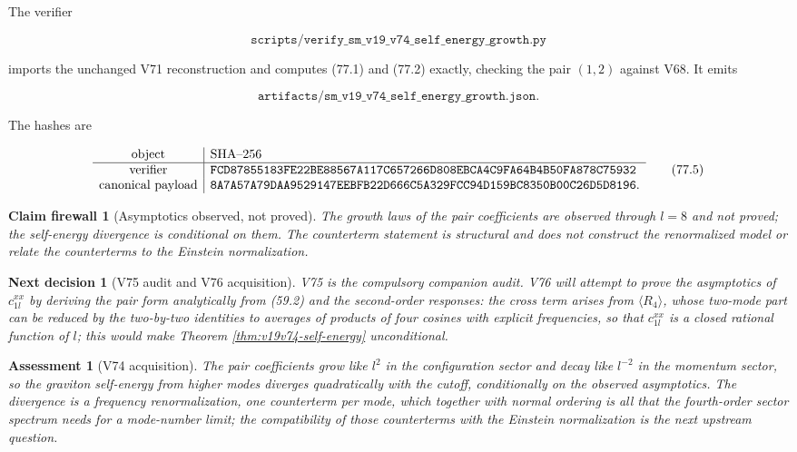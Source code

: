 \documentclass[11pt]{article}
\newtheorem{firewall}[theorem]{Claim firewall}
\newtheorem{decision}[theorem]{Next decision}
\newtheorem{assessment}[theorem]{Assessment}
\theoremstyle{remark}
\begin{document}
The verifier

\[
 \texttt{scripts/verify\_sm\_v19\_v74\_self\_energy\_growth.py}      \tag{77.3}
\]

imports the unchanged V71 reconstruction and computes (77.1) and
(77.2) exactly, checking the pair \((1,2)\) against V68.  It emits

\[
 \texttt{artifacts/sm\_v19\_v74\_self\_energy\_growth.json}.         \tag{77.4}
\]

The hashes are

\[
\begin{array}{c|l}
\hbox{object}&\hbox{SHA--256}\\ \hline
\hbox{verifier}&
\texttt{FCD87855183FE22BE88567A117C657266D808EBCA4C9FA64B4B50FA878C75932}\\
\hbox{canonical payload}&
\texttt{8A7A57A79DAA9529147EEBFB22D666C5A329FCC94D159BC8350B00C26D5D8196}.
\end{array}                                                     \tag{77.5}
\]

\begin{firewall}[Asymptotics observed, not proved]
\label{fire:v19v74}
The growth laws of the pair coefficients are observed through
\(l=8\) and not proved; the self-energy divergence is conditional on
them.  The counterterm statement is structural and does not construct
the renormalized model or relate the counterterms to the Einstein
normalization.
\end{firewall}

\begin{decision}[V75 audit and V76 acquisition]
\label{dec:v19v74-next}
V75 is the compulsory companion audit.  V76 will attempt to prove the
asymptotics of \(c^{xx}_{1l}\) by deriving the pair form analytically
from (59.2) and the second-order responses: the cross term arises from
\(\langle R_4\rangle\), whose two-mode part can be reduced by the
two-by-two identities to averages of products of four cosines with
explicit frequencies, so that \(c^{xx}_{1l}\) is a closed rational
function of \(l\); this would make Theorem \ref{thm:v19v74-self-energy}
unconditional.
\end{decision}

\begin{assessment}[V74 acquisition]
\label{ass:v19v74}
The pair coefficients grow like \(l^2\) in the configuration sector and
decay like \(l^{-2}\) in the momentum sector, so the graviton
self-energy from higher modes diverges quadratically with the cutoff,
conditionally on the observed asymptotics.  The divergence is a
frequency renormalization, one counterterm per mode, which together
with normal ordering is all that the fourth-order sector spectrum
needs for a mode-number limit; the compatibility of those counterterms
with the Einstein normalization is the next upstream question.
\end{assessment}
\end{document}
